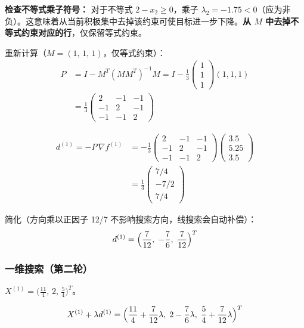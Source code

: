 {\textbf{检查不等式乘子符号：} 对于不等式 $2-x_2 \ge 0$，乘子 $\lambda_2 = -1.75 < 0$（应为非负）。这意味着从当前积极集中去掉该约束可使目标进一步下降。\textbf{从 $M$ 中去掉不等式约束对应的行}，仅保留等式约束。

\medskip
重新计算（$M = (1,\,1,\,1)$，仅等式约束）：
\[
\begin{aligned}
P &= I - M^T(MM^T)^{-1}M
   = I - \frac{1}{3}\begin{pmatrix}1\\1\\1\end{pmatrix}(1,1,1) \\
  &= \frac{1}{3}\begin{pmatrix} 2 & -1 & -1 \\ -1 & 2 & -1 \\ -1 & -1 & 2 \end{pmatrix}
\end{aligned}
\]

\[
\begin{aligned}
d^{(1)} = -P\,\nabla f^{(1)}
&= -\frac{1}{3}\begin{pmatrix} 2 & -1 & -1 \\ -1 & 2 & -1 \\ -1 & -1 & 2 \end{pmatrix}\begin{pmatrix}3.5\\5.25\\3.5\end{pmatrix} \\
&= \frac{1}{3}\begin{pmatrix} 7/4 \\ -7/2 \\ 7/4 \end{pmatrix}
\end{aligned}
\]

简化（方向乘以正因子 12/7 不影响搜索方向，线搜索会自动补偿）：
\[
d^{(1)} = \Bigl(\frac{7}{12},\; -\frac{7}{6},\; \frac{7}{12}\Bigr)^T
\]

\subsubsection{一维搜索（第二轮）}

$X^{(1)} = \bigl(\frac{11}{4},\,2,\,\frac{5}{4}\bigr)^T$。

{\small
\[
X^{(1)} + \lambda d^{(1)} = \Bigl(\frac{11}{4}+\frac{7}{12}\lambda,\; 2-\frac{7}{6}\lambda,\; \frac{5}{4}+\frac{7}{12}\lambda\Bigr)^T
\]
}

}
